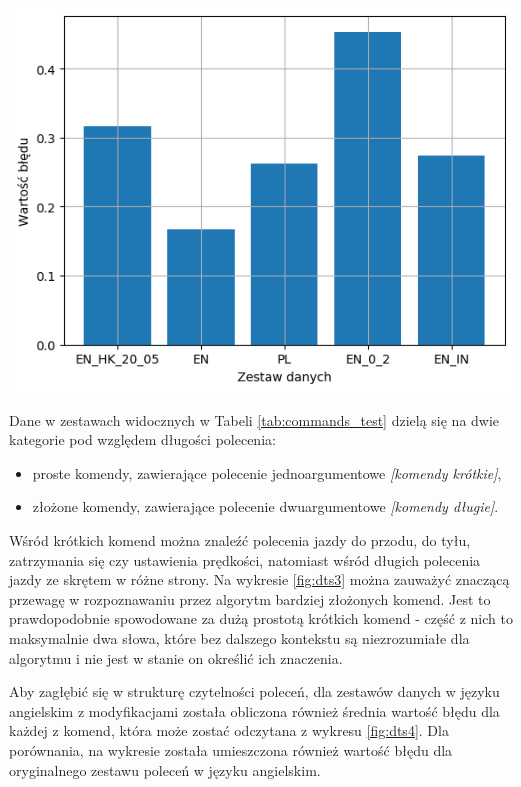 \begin{center}
    \includegraphics[width=0.95\linewidth]{files/output2.png}
    \label{fig:dts2}
\end{center}


Dane w zestawach widocznych w Tabeli \ref{tab:commands_test} dzielą się na dwie kategorie pod względem długości polecenia:
\begin{itemize}
    \item proste komendy, zawierające polecenie jednoargumentowe \textit{[komendy krótkie]},
    \item złożone komendy, zawierające polecenie dwuargumentowe \textit{[komendy długie]}.
\end{itemize}

Wśród krótkich komend można znaleźć polecenia jazdy do przodu, do tyłu, zatrzymania się czy ustawienia prędkości, natomiast wśród długich polecenia jazdy ze skrętem w różne strony. Na wykresie \ref{fig:dts3} można zauważyć znaczącą przewagę w rozpoznawaniu przez algorytm bardziej złożonych komend. Jest to prawdopodobnie spowodowane za dużą prostotą krótkich komend - część z nich to maksymalnie dwa słowa, które bez dalszego kontekstu są niezrozumiałe dla algorytmu i nie jest w stanie on określić ich znaczenia. 

Aby zagłębić się w strukturę czytelności poleceń, dla zestawów danych w języku angielskim z modyfikacjami została obliczona również średnia wartość błędu dla każdej z komend, która może zostać odczytana z wykresu \ref{fig:dts4}. Dla porównania, na wykresie została umieszczona również wartość błędu dla oryginalnego zestawu poleceń w języku angielskim.


